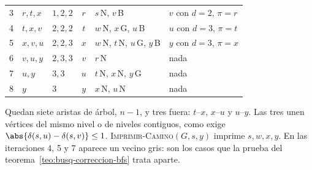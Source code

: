 \documentclass[11pt,letterpaper]{article}
\begin{document}
\begin{ejemplo}
\begin{center}
\begin{tabular}{cllcll}
    3 & $r, t, x$ & $1, 2, 2$ & $r$ & $s$\,N, $v$\,B
      & $v$ con $d = 2$, $\pi = r$ \\
    4 & $t, x, v$ & $2, 2, 2$ & $t$ & $w$\,N, $x$\,G, $u$\,B
      & $u$ con $d = 3$, $\pi = t$ \\
    5 & $x, v, u$ & $2, 2, 3$ & $x$ & $w$\,N, $t$\,N, $u$\,G, $y$\,B
      & $y$ con $d = 3$, $\pi = x$ \\
    6 & $v, u, y$ & $2, 3, 3$ & $v$ & $r$\,N & nada \\
    7 & $u, y$ & $3, 3$ & $u$ & $t$\,N, $x$\,N, $y$\,G & nada \\
    8 & $y$ & $3$ & $y$ & $x$\,N, $u$\,N & nada \\
    \bottomrule
  \end{tabular}
  \end{center}
  Quedan siete aristas de árbol, $n - 1$, y tres fuera: $t$--$x$,
  $x$--$u$ y $u$--$y$. Las tres unen vértices del mismo nivel o de
  niveles contiguos, como exige
  $\abs{\delta(s, u) - \delta(s, v)} \leq 1$.
  \textsc{Imprimir-Camino}$(G, s, y)$ imprime $s, w, x, y$. En las
  iteraciones 4, 5 y 7 aparece un vecino gris: son los casos que la
  prueba del teorema~\ref{teo:busq-correccion-bfs} trata aparte.
\end{ejemplo}
\end{document}

